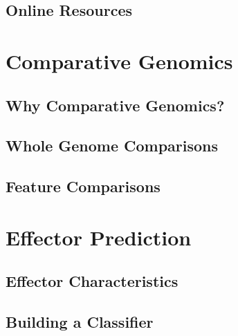 \subsection{Online Resources}



\section{Comparative Genomics}

\subsection{Why Comparative Genomics?}


\subsection{Whole Genome Comparisons}


\subsection{Feature Comparisons}



\section{Effector Prediction}

\subsection{Effector Characteristics}

\subsection{Building a Classifier}


